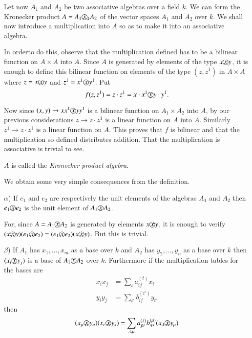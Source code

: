 Let now $A_1$ and $A_2$ be two associative algebras over a field
$k$. We can form the Kronecker product $A = A_1 \text{\textcircled{$x$}}_k 
A_2$ of the vector spaces $A_1$ and $A_2$ over $k$. We shall now
introduce a multiplication into $A$ so as to make it into an
associative algebra. 

In order\pageoriginale to do this, observe that the multiplication
defined has to be 
a bilinear function on $A \times A$ into $A$. Since $A$ is generated by
elements of the type $x  \text{\textcircled{$x$}}  y$, it is enough to define
this bilinear function on elements of the type $(z,z^1)$ in $A \times
A$ where $z = x  \text{\textcircled{$x$}} y$ and $z^1 = x^1 \text{\textcircled{$x$}}
 y^1$. Put 
$$
f(z,z^1) = z \cdot z^1 = x \cdot x^1  \text{\textcircled{$x$}}  y \cdot y^1.
$$


Now since $(x,y) \rightarrow x  x^1\text{\textcircled{$x$}}  y y^1$ is a
bilinear function on $A_1 \times A_2$ into $A$, by our previous
considerations $z \rightarrow z\cdot z^1$ is a linear function on $A$ into
$A$. Similarly $z^1 \rightarrow z \cdot z^1$ is a linear function on
$A$. This proves that $f$ is bilinear and that the multiplication so
defined distributes addition. That the multiplication is associative
is trivial to see. 

$A$ is called the \textit{Kronecker product algebra}.

We obtain some very simple consequences from the definition.

$\alpha$) If $e_1$ and $e_2$ are respectively the unit elements of
the algebras $A_1$ and $A_2$ then $e_1 \text{\textcircled{$x$}}  e_2$  is the
unit element of $A_1 \text{\textcircled{$x$}}  A_2$. 

For, since $A = A_1 \text{\textcircled{$x$}}  A_2$ is generated by elements
$x \text{\textcircled{$x$}}  y$, it is enough to verify $(x  \text{\textcircled{$x$}}
 y)  (e_1  \text{\textcircled{$x$}}  e_2) = (e_1  \text{\textcircled{$x$}}  e_2 )
 (x  \text{\textcircled{$x$}}  y)$. But this is trivial. 

$\beta$) If $A_1$ has $x_1, \ldots, x_m$ as a base over $k$ and $A_2$
 has $y_2,\ldots , y_n$ as a base over $k$ then $(x_i
 \text{\textcircled{$x$}} y_j)$ is a base of $A_1 \text{\textcircled{$x$}} A_2$
 over $k$. Furthermore if the multiplication tables for the bases are  
\begin{align*}
x_i  x_j & = \sum_t a_{ij}^{(t)}  x_t\\
y_i  y_j & = \sum_{t'} b_{ij}^{(t')}  y_{t'}
\end{align*}
then\pageoriginale 
$$
(x_p  \text{\textcircled{$x$}}  y_q)  (x_r  \text{\textcircled{$x$}}  y_s) =
\sum_{\lambda,\mu} a_{pr}^{(\lambda)}   b^{(\mu)}_{qs} (x_\lambda 
\text{\textcircled{$x$}}  y_\mu ) 
$$

